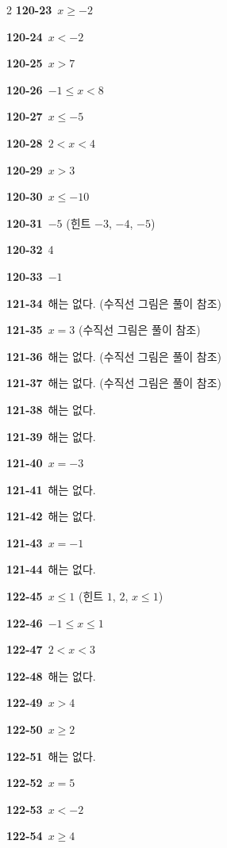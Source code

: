 \documentclass[10pt,a4paper]{article}
\begin{document}
\begin{multicols}{2}
\noindent\textbf{120-23}\ $x\ge -2$\par
\noindent\textbf{120-24}\ $x<-2$\par
\noindent\textbf{120-25}\ $x>7$\par
\noindent\textbf{120-26}\ $-1\le x<8$\par
\noindent\textbf{120-27}\ $x\le -5$\par
\noindent\textbf{120-28}\ $2<x<4$\par
\noindent\textbf{120-29}\ $x>3$\par
\noindent\textbf{120-30}\ $x\le -10$\par
\noindent\textbf{120-31}\ $-5$ (힌트 $-3$, $-4$, $-5$)\par
\noindent\textbf{120-32}\ 4\par
\noindent\textbf{120-33}\ $-1$\par
\noindent\textbf{121-34}\ 해는 없다. (수직선 그림은 풀이 참조)\par
\noindent\textbf{121-35}\ $x=3$ (수직선 그림은 풀이 참조)\par
\noindent\textbf{121-36}\ 해는 없다. (수직선 그림은 풀이 참조)\par
\noindent\textbf{121-37}\ 해는 없다. (수직선 그림은 풀이 참조)\par
\noindent\textbf{121-38}\ 해는 없다.\par
\noindent\textbf{121-39}\ 해는 없다.\par
\noindent\textbf{121-40}\ $x=-3$\par
\noindent\textbf{121-41}\ 해는 없다.\par
\noindent\textbf{121-42}\ 해는 없다.\par
\noindent\textbf{121-43}\ $x=-1$\par
\noindent\textbf{121-44}\ 해는 없다.\par
\noindent\textbf{122-45}\ $x\le 1$ (힌트 $1$, $2$, $x\le 1$)\par
\noindent\textbf{122-46}\ $-1\le x\le 1$\par
\noindent\textbf{122-47}\ $2<x<3$\par
\noindent\textbf{122-48}\ 해는 없다.\par
\noindent\textbf{122-49}\ $x>4$\par
\noindent\textbf{122-50}\ $x\ge 2$\par
\noindent\textbf{122-51}\ 해는 없다.\par
\noindent\textbf{122-52}\ $x=5$\par
\noindent\textbf{122-53}\ $x<-2$\par
\noindent\textbf{122-54}\ $x\ge 4$\par

\end{multicols}
\end{document}
